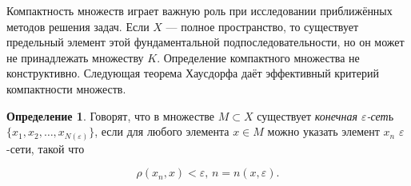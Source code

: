 \documentclass[12pt,a4paper,titlepage,oneside]{book}
\theoremstyle{definition}
\newtheorem*{definition}{Определение}
\theoremstyle{plain}
\theoremstyle{break}
\theoremstyle{remark}
\theoremstyle{remark}
\theoremstyle{remark}
\theoremstyle{remark}
\theoremstyle{plain}
\theoremstyle{plain}
\begin{document}
Компактность множеств играет важную роль при исследовании приближённых методов решения задач.
Если $X$ --- полное пространство, то существует предельный элемент этой фундаментальной подпоследовательности, но он может не принадлежать множеству $K$.
Определение компактного множества не конструктивно. Следующая теорема Хаусдорфа даёт эффективный критерий компактности множеств.

\begin{definition}
Говорят, что в множестве $M \subset X$ существует \textit{конечная $\varepsilon$-сет}ь $\lbrace x_1,x_2,\ldots,x_{N(\varepsilon)} \rbrace$, если для любого элемента $x \in M$ можно указать элемент $x_n$ $\varepsilon$-сети, такой что

$$
\rho(x_n, x) < \varepsilon \mbox{, } n=n(x,\varepsilon).
$$

\end{definition}
\end{document}
